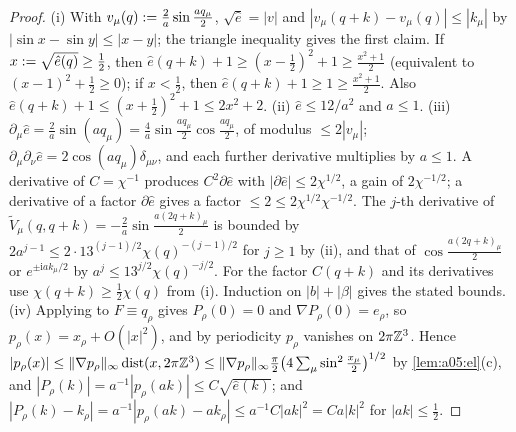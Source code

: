 \begin{proof}
(i) With $v_\mu(q):=\frac2a\sin\frac{aq_\mu}2$, $\sqrt{\hat e}=|v|$ and $|v_\mu(q+k)-v_\mu(q)|\le|k_\mu|$ by $|\sin x-\sin y|\le|x-y|$; the triangle inequality gives the first claim. If $x:=\sqrt{\hat e(q)}\ge\frac12$, then $\hat e(q+k)+1\ge(x-\frac12)^2+1\ge\frac{x^2+1}2$ (equivalent to $(x-1)^2+\frac12\ge0$); if $x<\frac12$, then $\hat e(q+k)+1\ge1\ge\frac{x^2+1}2$. Also $\hat e(q+k)+1\le(x+\frac12)^2+1\le2x^2+2$.
(ii) $\hat e\le12/a^2$ and $a\le1$.
(iii) $\partial_\mu\hat e=\frac2a\sin(aq_\mu)=\frac4a\sin\frac{aq_\mu}2\cos\frac{aq_\mu}2$, of modulus $\le2|v_\mu|$; $\partial_\mu\partial_\nu\hat e=2\cos(aq_\mu)\delta_{\mu\nu}$, and each further derivative multiplies by $a\le1$. A derivative of $C=\chi^{-1}$ produces $C^2\partial\hat e$ with $|\partial\hat e|\le2\chi^{1/2}$, a gain of $2\chi^{-1/2}$; a derivative of a factor $\partial\hat e$ gives a factor $\le2\le2\chi^{1/2}\chi^{-1/2}$. The $j$-th derivative of $\tilde V_\mu(q,q+k)=-\frac2a\sin\frac{a(2q+k)_\mu}2$ is bounded by $2a^{j-1}\le2\cdot13^{(j-1)/2}\chi(q)^{-(j-1)/2}$ for $j\ge1$ by (ii), and that of $\cos\frac{a(2q+k)_\mu}2$ or $e^{\pm\mathrm iak_\mu/2}$ by $a^j\le13^{j/2}\chi(q)^{-j/2}$. For the factor $C(q+k)$ and its derivatives use $\chi(q+k)\ge\frac12\chi(q)$ from (i). Induction on $|b|+|\beta|$ gives the stated bounds.
(iv) Applying \cite[(3-2)]{Rei88b} to $F\equiv q_\rho$ gives $P_\rho(0)=0$ and $\nabla P_\rho(0)=e_\rho$, so $p_\rho(x)=x_\rho+O(|x|^2)$, and by periodicity $p_\rho$ vanishes on $2\pi\mathbb Z^3$. Hence $|p_\rho(x)|\le\|\nabla p_\rho\|_\infty\operatorname{dist}(x,2\pi\mathbb Z^3)\le\|\nabla p_\rho\|_\infty\frac\pi2\big(4\sum_\mu\sin^2\frac{x_\mu}2\big)^{1/2}$ by \cref{lem:a05:el}(c), and $|P_\rho(k)|=a^{-1}|p_\rho(ak)|\le C\sqrt{\hat e(k)}$; and $|P_\rho(k)-k_\rho|=a^{-1}|p_\rho(ak)-ak_\rho|\le a^{-1}C|ak|^2=Ca|k|^2$ for $|ak|\le\frac12$.
\end{proof}

